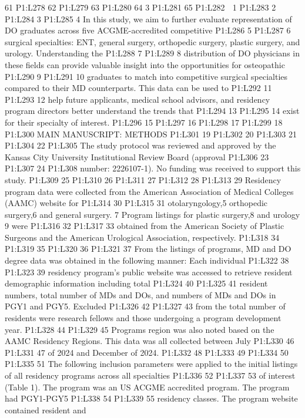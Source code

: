 61 P1:L278 62 P1:L279 63 P1:L280 64 3 P1:L281 65 P1:L282  1 P1:L283 2
P1:L284 3 P1:L285 4 In this study, we aim to further evaluate
representation of DO graduates across five ACGME-accredited competitive
P1:L286 5 P1:L287 6 surgical specialties: ENT, general surgery,
orthopedic surgery, plastic surgery, and urology. Understanding the
P1:L288 7 P1:L289 8 distribution of DO physicians in these fields can
provide valuable insight into the opportunities for osteopathic P1:L290
9 P1:L291 10 graduates to match into competitive surgical specialties
compared to their MD counterparts. This data can be used to P1:L292 11
P1:L293 12 help future applicants, medical school advisors, and
residency program directors better understand the trends that P1:L294 13
P1:L295 14 exist for their specialty of interest. P1:L296 15 P1:L297 16
P1:L298 17 P1:L299 18 P1:L300 MAIN MANUSCRIPT: METHODS P1:L301 19
P1:L302 20 P1:L303 21 P1:L304 22 P1:L305 The study protocol was reviewed
and approved by the Kansas City University Institutional Review Board
(approval P1:L306 23 P1:L307 24 P1:L308 number: 2226107-1). No funding
was received to support this study. P1:L309 25 P1:L310 26 P1:L311 27
P1:L312 28 P1:L313 29 Residency program data were collected from the
American Association of Medical Colleges (AAMC) website for P1:L314 30
P1:L315 31 otolaryngology,5 orthopedic surgery,6 and general surgery. 7
Program listings for plastic surgery,8 and urology 9 were P1:L316 32
P1:L317 33 obtained from the American Society of Plastic Surgeons and
the American Urological Association, respectively. P1:L318 34 P1:L319 35
P1:L320 36 P1:L321 37 From the listings of programs, MD and DO degree
data was obtained in the following manner: Each individual P1:L322 38
P1:L323 39 residency program's public website was accessed to retrieve
resident demographic information including total P1:L324 40 P1:L325 41
resident numbers, total number of MDs and DOs, and numbers of MDs and
DOs in PGY1 and PGY5. Excluded P1:L326 42 P1:L327 43 from the total
number of residents were research fellows and those undergoing a program
development year. P1:L328 44 P1:L329 45 Programs region was also noted
based on the AAMC Residency Regions. This data was all collected between
July P1:L330 46 P1:L331 47 of 2024 and December of 2024. P1:L332 48
P1:L333 49 P1:L334 50 P1:L335 51 The following inclusion parameters were
applied to the initial listings of all residency programs across all
specialties P1:L336 52 P1:L337 53 of interest (Table 1). The program was
an US ACGME accredited program. The program had PGY1-PGY5 P1:L338 54
P1:L339 55 residency classes. The program website contained resident and
